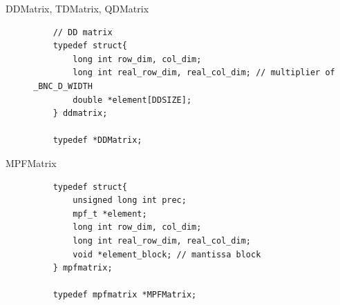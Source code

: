 \begin{description}
    \item[DDMatrix, TDMatrix, QDMatrix]\strut\par
    \begin{lstlisting}
    // DD matrix
    typedef struct{
        long int row_dim, col_dim;
        long int real_row_dim, real_col_dim; // multiplier of _BNC_D_WIDTH
        double *element[DDSIZE];
    } ddmatrix;

    typedef *DDMatrix;
    \end{lstlisting}

    \item[MPFMatrix]\strut\par
    \begin{lstlisting}
    typedef struct{
        unsigned long int prec;
        mpf_t *element;
        long int row_dim, col_dim;
        long int real_row_dim, real_col_dim;
        void *element_block; // mantissa block
    } mpfmatrix;

    typedef mpfmatrix *MPFMatrix;
    \end{lstlisting}
\end{description}

\section{}


